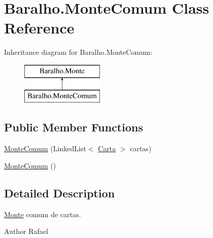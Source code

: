\hypertarget{class_baralho_1_1_monte_comum}{
\section{\-Baralho.\-Monte\-Comum \-Class \-Reference}
\label{class_baralho_1_1_monte_comum}
}
\-Inheritance diagram for \-Baralho.\-Monte\-Comum\-:\begin{figure}[H]
\begin{center}
\leavevmode
\includegraphics[height=2.000000cm]{class_baralho_1_1_monte_comum}
\end{center}
\end{figure}
\subsection*{\-Public \-Member \-Functions}
\begin{DoxyCompactItemize}
\item 
\hyperlink{class_baralho_1_1_monte_comum_af3664ab9b41ef3ea435033c9ae0132b9}{\-Monte\-Comum} (\-Linked\-List$<$ \hyperlink{class_baralho_1_1_carta}{\-Carta} $>$ cartas)
\item 
\hyperlink{class_baralho_1_1_monte_comum_ae5f9907b5ae8ec73544895110c7a0395}{\-Monte\-Comum} ()
\end{DoxyCompactItemize}


\subsection{\-Detailed \-Description}
\hyperlink{class_baralho_1_1_monte}{\-Monte} comum de cartas. \begin{DoxyAuthor}{\-Author}
\-Rafael 
\end{DoxyAuthor}


